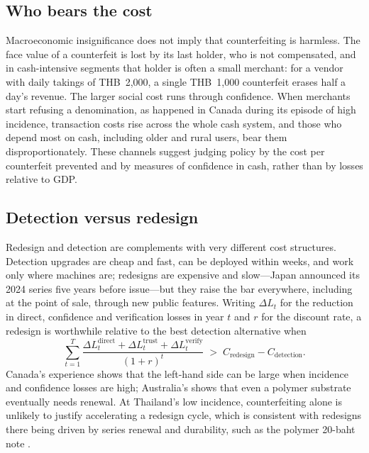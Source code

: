 \documentclass{article}
\theoremstyle{definition}
\theoremstyle{remark}
\begin{document}
\subsection{Who bears the cost}

Macroeconomic insignificance does not imply that counterfeiting is harmless. The face value of a counterfeit is lost by its last holder, who is not compensated, and in cash-intensive segments that holder is often a small merchant: for a vendor with daily takings of THB~2,000, a single THB~1,000 counterfeit erases half a day's revenue. The larger social cost runs through confidence. When merchants start refusing a denomination, as happened in Canada during its episode of high incidence, transaction costs rise across the whole cash system, and those who depend most on cash, including older and rural users, bear them disproportionately. These channels suggest judging policy by the cost per counterfeit prevented and by measures of confidence in cash, rather than by losses relative to GDP.

\subsection{Detection versus redesign}

Redesign and detection are complements with very different cost structures. Detection upgrades are cheap and fast, can be deployed within weeks, and work only where machines are; redesigns are expensive and slow---Japan announced its 2024 series five years before issue---but they raise the bar everywhere, including at the point of sale, through new public features. Writing $\Delta L_t$ for the reduction in direct, confidence and verification losses in year $t$ and $r$ for the discount rate, a redesign is worthwhile relative to the best detection alternative when
\begin{equation}
\sum_{t=1}^{T}\frac{\Delta L^{\mathrm{direct}}_t+\Delta L^{\mathrm{trust}}_t+\Delta L^{\mathrm{verify}}_t}{(1+r)^{t}} \;>\; C_{\mathrm{redesign}}-C_{\mathrm{detection}} .
\label{eq:rule}
\end{equation}
Canada's experience shows that the left-hand side can be large when incidence and confidence losses are high; Australia's shows that even a polymer substrate eventually needs renewal. At Thailand's low incidence, counterfeiting alone is unlikely to justify accelerating a redesign cycle, which is consistent with redesigns there being driven by series renewal and durability, such as the polymer 20-baht note \citep{bot_banknotes}.
\end{document}
